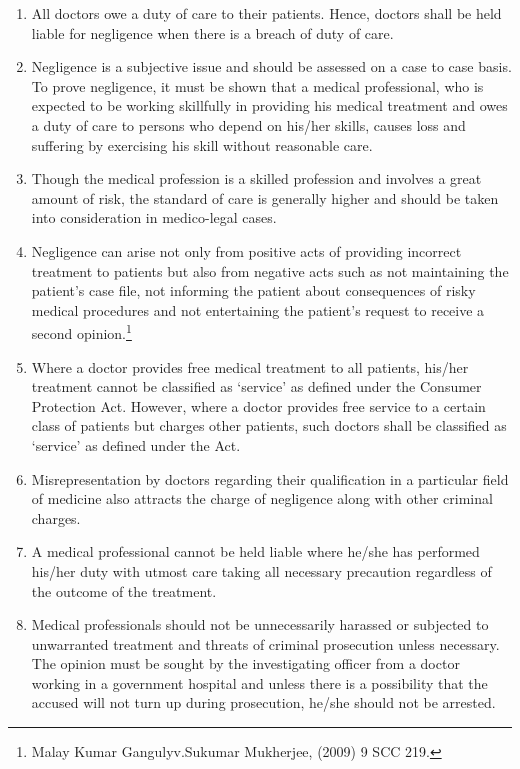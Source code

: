\begin{multicols}{2}
\vspace{-.1cm}

\begin{enumerate}
\itemsep=0pt

\item All doctors owe a duty of care to their patients. Hence, doctors shall be held liable for
negligence when there is a breach of duty of care.

\item Negligence is a subjective issue and should be assessed on a case to case basis. To prove
negligence, it must be shown that a medical professional, who is expected to be working skillfully
in providing his medical treatment and owes a duty of care to persons who depend on his/her
skills, causes loss and suffering by exercising his skill without reasonable care.

\item Though the medical profession is a skilled profession and involves a great amount of risk, the
standard of care is generally higher and should be taken into consideration in medico-legal cases.

\item Negligence can arise not only from positive acts of providing incorrect treatment to patients
but also from negative acts such as not maintaining the patient’s case file, not informing the
patient about consequences of risky medical procedures and not entertaining the patient’s request
to receive a second opinion.\footnote{Malay Kumar Gangulyv.Sukumar Mukherjee, (2009) 9 SCC 219.}

\item Where a doctor provides free medical treatment to all patients, his/her treatment cannot be
classified as ‘service’ as defined under the Consumer Protection Act. However, where a doctor
provides free service to a certain class of patients but charges other patients, such doctors shall be
classified as ‘service’ as defined under the Act.

\item Misrepresentation by doctors regarding their qualification in a particular field of medicine also
attracts the charge of negligence along with other criminal charges.

\item A medical professional cannot be held liable where he/she has performed his/her duty with
utmost care taking all necessary precaution regardless of the outcome of the treatment.

\item Medical professionals should not be unnecessarily harassed or subjected to unwarranted
treatment and threats of criminal prosecution unless necessary. The opinion must be sought by
the investigating officer from a doctor working in a government hospital and unless there is a
possibility that the accused will not turn up during prosecution, he/she should not be arrested.


\end{enumerate}
\end{multicols}
